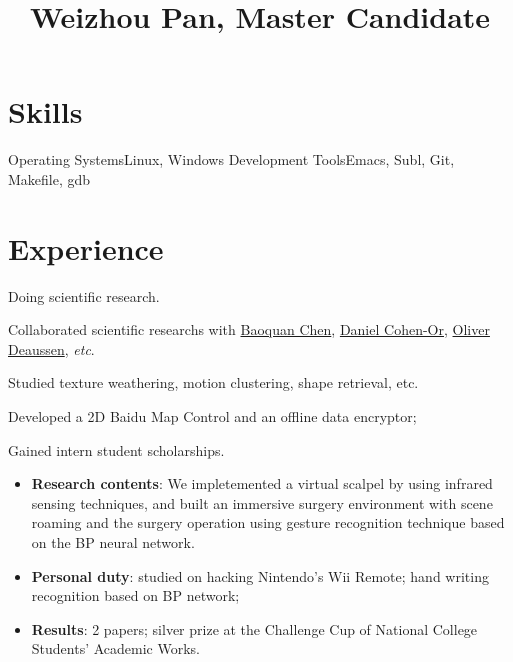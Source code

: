 \documentclass[11pt,a4paper,nolmodern]{moderncv}
\title{Weizhou Pan, Master Candidate}
\begin{document}
\setmainfont{Minion Pro}
\setsansfont{Myriad Pro}

\maketitle

\section{Skills}

           {Operating Systems}{Linux, Windows}
           {Development Tools}{Emacs, Subl, Git, Makefile, gdb}

\section{Experience}

{Doing scientific research.
\begin{tightitemize}%
 \item Collaborated scientific researchs with \href{http://web.siat.ac.cn/~baoquan/}{Baoquan
     Chen}, \href{http://www.math.tau.ac.il/~dcor/}{Daniel Cohen-Or},
   \href{http://graphics.uni-konstanz.de/mitarbeiter/deussen.php}{Oliver
     Deaussen}, \textsl{etc}.
 \item Studied texture weathering, motion clustering, shape retrieval, etc.
 \item Developed a 2D Baidu Map Control and an offline data encryptor;
 \item Gained intern student scholarships.
 \end{tightitemize}}

%
  {
\begin{itemize}
 \item \textbf{Research contents}: We impletemented a virtual scalpel by using
   infrared sensing techniques, and built an immersive surgery environment 
   with scene roaming and the surgery operation using gesture recognition technique based on the BP neural network.
 \item \textbf{Personal duty}: studied on hacking Nintendo's Wii Remote; hand writing recognition based on BP network;
 \item \textbf{Results}: 2 papers; silver prize at the Challenge Cup of National College Students' Academic Works.
\end{itemize}}
\end{document}
